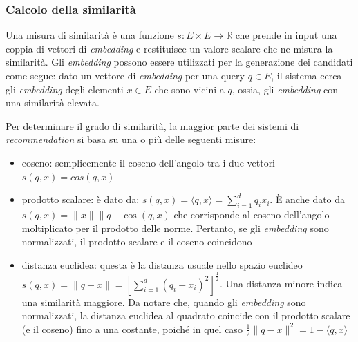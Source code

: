 \subsubsection{Calcolo della similarità}

Una misura di similarità è una funzione $s: E \times E \to \mathbb{R}$ che prende in input una coppia di vettori di \textit{embedding} e restituisce un valore scalare che ne misura la similarità. Gli \textit{embedding} possono essere utilizzati per la generazione dei candidati come segue: dato un vettore di \textit{embedding} per una query $q \in E$, il sistema cerca gli \textit{embedding} degli elementi $x \in E$ che sono vicini a $q$, ossia, gli \textit{embedding} con una similarità elevata.

Per determinare il grado di similarità, la maggior parte dei sistemi di \textit{recommendation} si basa su una o più delle seguenti misure:

\begin{itemize}
    \item coseno: semplicemente il coseno dell'angolo tra i due vettori $s(q, x) = cos(q, x)$
    \item prodotto scalare: è dato da: $s(q, x) = \langle q, x \rangle = \sum\limits_{i=1}^{d} q_i x_i$. È anche dato da $s(q, x) = \|x\| \|q\| \cos(q, x)$ che corrisponde al coseno dell'angolo moltiplicato per il prodotto delle norme. Pertanto, se gli \textit{embedding} sono normalizzati, il prodotto scalare e il coseno coincidono    
    \item distanza euclidea: questa è la distanza usuale nello spazio euclideo $s(q, x) = \|q - x\| = \left[ \sum\limits_{i=1}^{d} (q_i - x_i)^2 \right]^{\frac{1}{2}}$. Una distanza minore indica una similarità maggiore. Da notare che, quando gli \textit{embedding} sono normalizzati, la distanza euclidea al quadrato coincide con il prodotto scalare (e il coseno) fino a una costante, poiché in quel caso $\frac{1}{2} \|q - x\|^2 = 1 - \langle q, x \rangle$
\end{itemize}


